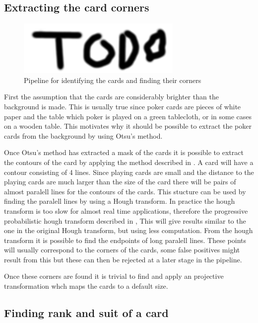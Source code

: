 \documentclass[journal,twoside]{IEEEtran}
\begin{document}
\subsection{Extracting the card corners}

\begin{figure}[placement h]
\centering
\includegraphics[scale=0.4, trim= 0cm 0cm 0cm 0cm]{TODO.png}
\caption{Pipeline for identifying the cards and finding their corners}
\label{fig:CornerOutline}
\end{figure}

First the assumption that the cards are considerably brighter than the background is made. This is usually true since poker cards are pieces of white paper and the table which poker is played on a green tablecloth, or in some cases on a wooden table.
This motivates why it should be possible to extract the poker cards from the background by using Otsu's method\cite{OTSU}.

Once Otsu's method has extracted a mask of the cards it is possible to extract the contours of the card by applying the method described in \cite{CONTOURS}. A card will have a contour consisting of 4 lines. Since playing cards are small and the distance to the playing cards are much larger than the size of the card there will be pairs of almost paralell lines for the contours of the cards. This stucture can be used by finding the paralell lines by using a Hough transform. In practice the hough transform is too slow for almost real time applications, therefore the progressive probabilistic hough transform described in \cite{HoughP}, This will give results similar to the one in the original Hough transform, but using less computation. From the hough transform it is possible to find the endpoints of long paralell lines. These points will usually correspond to the corners of the cards, some false positives might result from this but these can then be rejected at a later stage in the pipeline.

Once these corners are found it is trivial to find and apply an projective transformation whch maps the cards to a default size.

\subsection{Finding rank and suit of a card}
\end{document}
